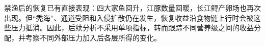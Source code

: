 禁渔后的恢复已有直接表现：四大家鱼回升，江豚数量回暖，长江鲟产卵场也再次出现。但“秃海”、通道受阻和入侵扩散仍在发生，恢复收益沿食物链上行时会被这些压力抵消。因此，后续分析不采用单项指标，转而跟踪不同营养级之间的收益分配，并考察不同外部压力加入后各层所得的变化。
